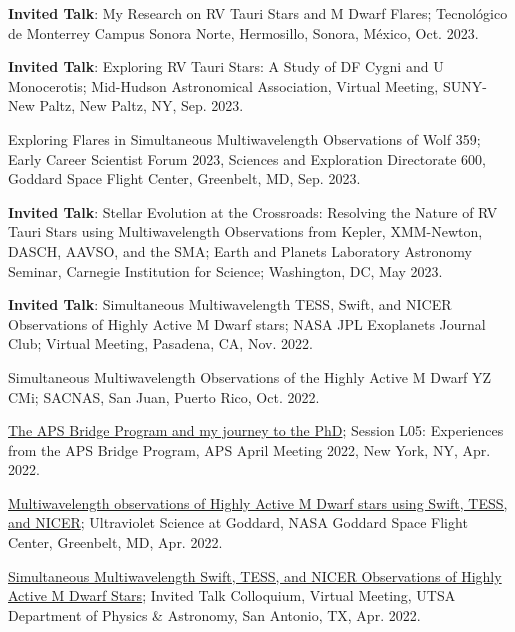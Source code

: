 \documentclass[letter,12pt]{article}
\begin{document}
\begin{etaremune}
\item \textbf{Invited Talk}: My Research on RV Tauri Stars and M Dwarf Flares; Tecnol\'{o}gico de Monterrey Campus Sonora Norte, Hermosillo, Sonora, M\'{e}xico, Oct. 2023.

\item \textbf{Invited Talk}: Exploring RV Tauri Stars: A Study of DF Cygni and U Monocerotis; Mid-Hudson Astronomical Association, Virtual Meeting, SUNY-New Paltz, New Paltz, NY, Sep. 2023.

\item Exploring Flares in Simultaneous Multiwavelength Observations of Wolf 359; Early Career Scientist Forum 2023, Sciences and Exploration Directorate 600, Goddard Space Flight Center, Greenbelt, MD, Sep. 2023.

\item \textbf{Invited Talk}: Stellar Evolution at the Crossroads: Resolving the Nature of RV Tauri Stars using Multiwavelength Observations from Kepler, XMM-Newton, DASCH, AAVSO, and the SMA; Earth and Planets Laboratory Astronomy Seminar, Carnegie Institution for Science; Washington, DC, May 2023.

\item \textbf{Invited Talk}: Simultaneous Multiwavelength TESS, Swift, and NICER Observations of Highly Active M Dwarf stars; NASA JPL Exoplanets Journal Club; Virtual Meeting, Pasadena, CA, Nov. 2022.

\item Simultaneous Multiwavelength Observations of the Highly Active M Dwarf YZ CMi; SACNAS, San Juan, Puerto Rico, Oct. 2022.

\item \href{https://meetings.aps.org/Meeting/APR22/Session/L05.1}{The APS Bridge Program and my journey to the PhD}; Session L05: Experiences from the APS Bridge Program, APS April Meeting 2022, New York, NY, Apr. 2022.

\item \href{https://asd.gsfc.nasa.gov/conferences/UVsymposium2022/agenda/}{Multiwavelength observations of Highly Active M Dwarf stars using Swift, TESS, and NICER}; Ultraviolet Science at Goddard, NASA Goddard Space Flight Center, Greenbelt, MD, Apr. 2022.

\item \href{https://twitter.com/UTSA_PhyAst/status/1508503792261779464?s=20&t=dVQ_0wPfIXmUPicaAi6VLg}{Simultaneous Multiwavelength Swift, TESS, and NICER Observations of Highly Active M Dwarf Stars}; Invited Talk Colloquium, Virtual Meeting, UTSA Department of Physics \& Astronomy, San Antonio, TX, Apr. 2022. 


\end{etaremune}
\end{document}
